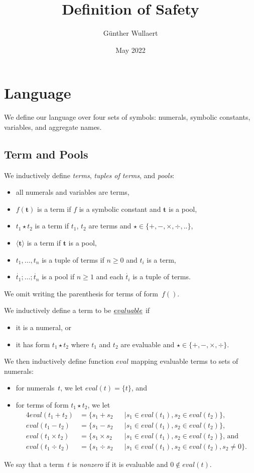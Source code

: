 \documentclass{article}
\title{Definition of Safety}
\author{Günther Wullaert}
\date{May 2022}
\newcommand{\pool}[1]{\boldsymbol{#1}}
\newcommand{\tuple}[1]{\dot{#1}}
\newcommand{\set}[1]{\{#1\}}
\newcommand\Eval{\mathit{eval}}
\begin{document}
	\maketitle

	\section{Language}
	We define our language over four sets of symbols:
	numerals, symbolic constants, variables, and aggregate names.


	\subsection{Term and Pools}

	We inductively define \emph{terms}, \emph{tuples of terms}, and \emph{pools}:
	\begin{itemize}
		\item all numerals and variables are terms,
		\item $f(\pool{t})$ is a term if $f$ is a symbolic constant and $\pool{t}$ is a pool,
		\item $t_1 \star t_2$ is a term if $t_1$, $t_2$ are terms and ${\star} \in \set{{+}, {-}, {\times}, {\div}, {..}}$,
		\item $\langle \pool{t} \rangle$ is a term if $\pool{t}$ is a pool,
		\item $t_1,\dots,t_n$ is a tuple of terms if $n \ge 0$ and $t_i$ is a term,
		\item $\tuple{t_1};\dots;\tuple{t_n}$ is a pool if $n \ge 1$ and each $\tuple{t_i}$ is a tuple of terms.
	\end{itemize}
	We omit writing the parenthesis for terms of form~\(f()\).

	We inductively define a term to be $\emph{evaluable}$ if
	\begin{itemize}
		\item it is a numeral, or
		\item it has form $t_1 \star t_2$ where $t_1$ and $t_2$ are evaluable and $\star \in \set{{+}, {-}, {\times}, {\div}}$.
	\end{itemize}
	We then inductively define function $\Eval$ mapping evaluable terms to sets of numerals:
	\begin{itemize}
	\item for numerals~\(t\), we let $\Eval(t) = \{t\}$, and
	\item for terms of form $t_1 \star t_2$, we let
	\begin{alignat*}{4}
		\Eval(t_1 + t_2) &= \{ s_1 + s_2 &&\mid s_1 \in \Eval(t_1), s_2 \in \Eval(t_2) \}, \\
		\Eval(t_1 - t_2) &= \{ s_1 - s_2 &&\mid s_1 \in \Eval(t_1), s_2 \in \Eval(t_2) \}, \\
		\Eval(t_1 \times t_2) &= \{ s_1 \times s_2 &&\mid s_1 \in \Eval(t_1), s_2 \in \Eval(t_2) \}\text{, and} \\
		\Eval(t_1 \div t_2) &= \{ s_1 \div s_2 &&\mid s_1 \in \Eval(t_1), s_2 \in \Eval(t_2), s_2 \neq 0 \}.
	\end{alignat*}
	\end{itemize}
	We say that a term~$t$ is \emph{nonzero} if it is evaluable and $0 \notin \Eval(t)$.
\end{document}
